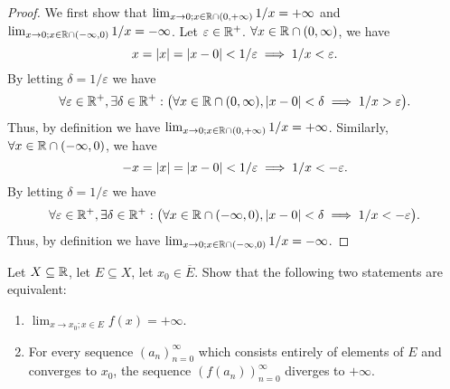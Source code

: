 \begin{proof}
  We first show that \(\lim_{x \to 0 ; x \in \mathbb{R} \cap (0, +\infty)} 1 / x = +\infty\) and \(\lim_{x \to 0 ; x \in \mathbb{R} \cap (-\infty, 0)} 1 / x = -\infty\).
  Let \(\varepsilon \in \mathbb{R}^+\).
  \(\forall x \in \mathbb{R} \cap (0, \infty)\), we have
  \[
    x = \left\lvert x\right\rvert = \left\lvert x - 0\right\rvert < 1 / \varepsilon \implies 1 / x < \varepsilon.
  \]
  By letting \(\delta = 1 / \varepsilon\) we have
  \[
    \forall \varepsilon \in \mathbb{R}^+, \exists \delta \in \mathbb{R}^+ : \big(\forall x \in \mathbb{R} \cap (0, \infty), \left\lvert x - 0\right\rvert < \delta \implies 1 / x > \varepsilon\big).
  \]
  Thus, by definition we have \(\lim_{x \to 0 ; x \in \mathbb{R} \cap (0, +\infty)} 1 / x = +\infty\).
  Similarly, \(\forall x \in \mathbb{R} \cap (-\infty, 0)\), we have
  \[
    -x = \left\lvert x\right\rvert = \left\lvert x - 0\right\rvert < 1 / \varepsilon \implies 1 / x < -\varepsilon.
  \]
  By letting \(\delta = 1 / \varepsilon\) we have
  \[
    \forall \varepsilon \in \mathbb{R}^+, \exists \delta \in \mathbb{R}^+ : \big(\forall x \in \mathbb{R} \cap (-\infty, 0), \left\lvert x - 0\right\rvert < \delta \implies 1 / x < -\varepsilon\big).
  \]
  Thus, by definition we have \(\lim_{x \to 0 ; x \in \mathbb{R} \cap (-\infty, 0)} 1 / x = -\infty\).
\end{proof}

\begin{ac}\label{i:ac:9.5.3}
  Let \(X \subseteq \mathbb{R}\), let \(E \subseteq X\), let \(x_0 \in \overline{E}\).
  Show that the following two statements are equivalent:
  \begin{enumerate}
    \item \(\lim_{x \to x_0 ; x \in E} f(x) = +\infty\).
    \item For every sequence \((a_n)_{n = 0}^\infty\) which consists entirely of elements of \(E\) and converges to \(x_0\), the sequence \((f(a_n))_{n = 0}^\infty\) diverges to \(+\infty\).
  \end{enumerate}
\end{ac}

